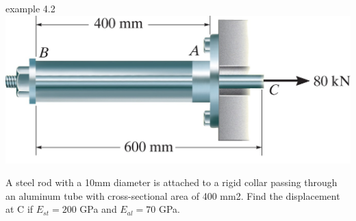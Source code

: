 \documentclass[
  letterpaper,
  ignorenonframetext,
  aspectratio=43,
  handout,
  12pt]{beamer}
\let\Oldincludegraphics\includegraphics
\renewcommand{\includegraphics}[2][]{\Oldincludegraphics[width=\textwidth,height=0.7\textheight,keepaspectratio]{#2}}
\begin{document}
\begin{frame}{example 4.2}
\protect\hypertarget{example-4.2}{}
\includegraphics{../images/example-4-2.jpg}

A steel rod with a 10mm diameter is attached to a rigid collar passing
through an aluminum tube with cross-sectional area of 400 mm2. Find the
displacement at C if \(E_{st} = 200\) GPa and \(E_{al} = 70\) GPa.
\end{frame}
\end{document}

